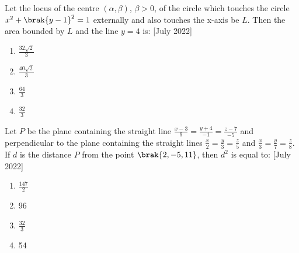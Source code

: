  \item{
    	
	    	Let the locus of the centre $(\alpha, \beta)$, $\beta > 0$, of the circle which touches the circle $x^2 + \brak{y - 1}^2 = 1$ externally and also touches the x-axis be $L$. Then the area bounded by $L$ and the line $y = 4$ is:
	    	\text{   }\hfill
	    	{[July 2022]}
	    	\begin{multicols}{4}
	    		\begin{enumerate}
	    			\item $\frac{32\sqrt{2}}{3}$
	    			\item $\frac{40\sqrt{2}}{3}$
	    			\item $\frac{64}{3}$
	    			\item $\frac{32}{3}$
	    		\end{enumerate}
	    	\end{multicols}
	    	
	    }
    \item{
	
		    Let $P$ be the plane containing the straight line $\frac{x-3}{9}=\frac{y+4}{-1}=\frac{z-7}{-5}$ and perpendicular to the plane containing the straight lines $\frac{x}{2}=\frac{y}{3}=\frac{z}{5}$ and $\frac{x}{3}=\frac{y}{7}=\frac{z}{8}.$ If $d$ is the distance $P$ from the point $\brak{2, -5, 11}$, then $d^2$ is equal to:
			\text{   }\hfill
			{[July 2022]}
			\begin{multicols}{4}
				\begin{enumerate}
						\item $\frac{147}{2}$
						\item 96
						\item $\frac{32}{3}$
						\item 54
				\end{enumerate}
			\end{multicols}
			
		}

